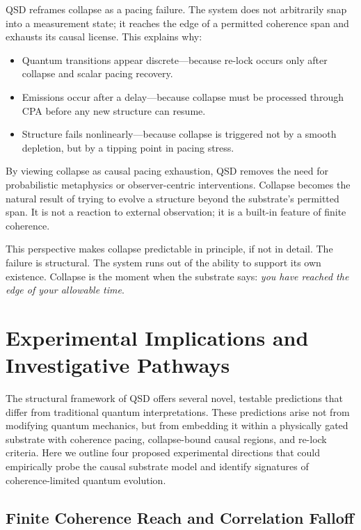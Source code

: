 \documentclass[preprints,article,submit,pdftex,moreauthors]{Definitions/mdpi}
\begin{document}
QSD reframes collapse as a pacing failure. The system does not arbitrarily snap into a measurement state; it reaches the edge of a permitted coherence span and exhausts its causal license. This explains why:
\begin{itemize}
    \item Quantum transitions appear discrete—because re-lock occurs only after collapse and scalar pacing recovery.
    \item Emissions occur after a delay—because collapse must be processed through CPA before any new structure can resume.
    \item Structure fails nonlinearly—because collapse is triggered not by a smooth depletion, but by a tipping point in pacing stress.
\end{itemize}

By viewing collapse as causal pacing exhaustion, QSD removes the need for probabilistic metaphysics or observer-centric interventions. Collapse becomes the natural result of trying to evolve a structure beyond the substrate’s permitted span. It is not a reaction to external observation; it is a built-in feature of finite coherence.

This perspective makes collapse predictable in principle, if not in detail. The failure is structural. The system runs out of the ability to support its own existence. Collapse is the moment when the substrate says: \emph{you have reached the edge of your allowable time}.

\section{Experimental Implications and Investigative Pathways}

The structural framework of QSD offers several novel, testable predictions that differ from traditional quantum interpretations. These predictions arise not from modifying quantum mechanics, but from embedding it within a physically gated substrate with coherence pacing, collapse-bound causal regions, and re-lock criteria. Here we outline four proposed experimental directions that could empirically probe the causal substrate model and identify signatures of coherence-limited quantum evolution.

\subsection{Finite Coherence Reach and Correlation Falloff}
\end{document}
